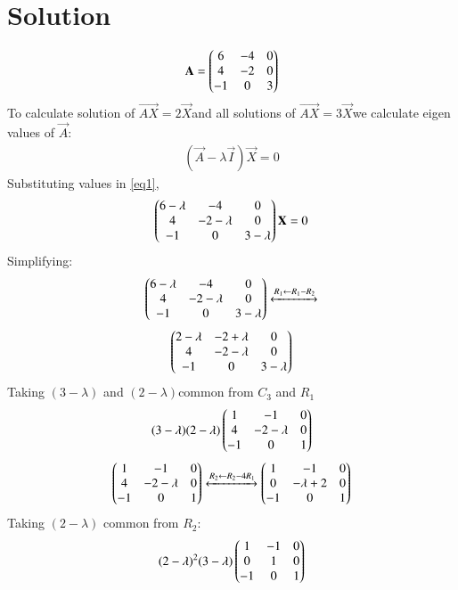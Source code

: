 \documentclass[journal,12pt,twocolumn]{IEEEtran}
\begin{document}
\section{Solution}
\begin{align}
\mathbf{A}=
\begin{pmatrix}6 & -4 & 0\\
4& -2 & 0\\
-1 &0 &3\end{pmatrix}
\end{align}
To calculate solution of  $\vec{AX}=2\vec{X}$and all solutions of $\vec{AX}=3\vec{X}$we calculate eigen values of $\vec{A}$:
\begin{align}\label{eq1}
(\vec{A}-\lambda\vec{I})\vec{X}=0
\end{align}
Substituting values in \eqref{eq1},
\begin{align}
\begin{pmatrix}6-\lambda& -4 & 0\\
4 & -2-\lambda & 0\\
-1 &0 &3-\lambda\end{pmatrix}
\mathbf{X}=0
\end{align}
Simplifying:
\begin{align}\label{eqdet}
\begin{pmatrix}6-\lambda& -4 & 0\\
4 & -2-\lambda & 0\\
-1 &0 &3-\lambda\end{pmatrix}
\xleftrightarrow[]{R_1 \leftarrow R_1-R_2}\nonumber
\end{align}
\begin{align}
    \begin{pmatrix}2-\lambda& -2+\lambda & 0\\
4 & -2-\lambda & 0\\
-1 &0 &3-\lambda\end{pmatrix}
\end{align}
Taking $(3-\lambda)$  and $(2-\lambda)$common from $C_3$ and $R_1$
\begin{align}
(3-\lambda)(2-\lambda)
    \begin{pmatrix}1&-1&0\\
            4&-2-\lambda &0\\
            -1&0&1\end{pmatrix}
\end{align}
\begin{align}\label{eqlambda}
\begin{pmatrix}1&-1&0\\
            4&-2-\lambda &0\\
            -1&0&1\end{pmatrix}
            \xleftrightarrow[]{R_2 \leftarrow R_2-4R_1}
    \begin{pmatrix}1&-1&0\\
            0&-\lambda +2&0\\
            -1&0&1\end{pmatrix}
\end{align}
Taking $(2-\lambda)$ common from $R_2$:
\begin{align}
(2-\lambda)^2(3-\lambda)
\begin{pmatrix}
1 &-1 &0\\
0&1&0\\
-1&0&1
\end{pmatrix}
\end{align}
\end{document}
